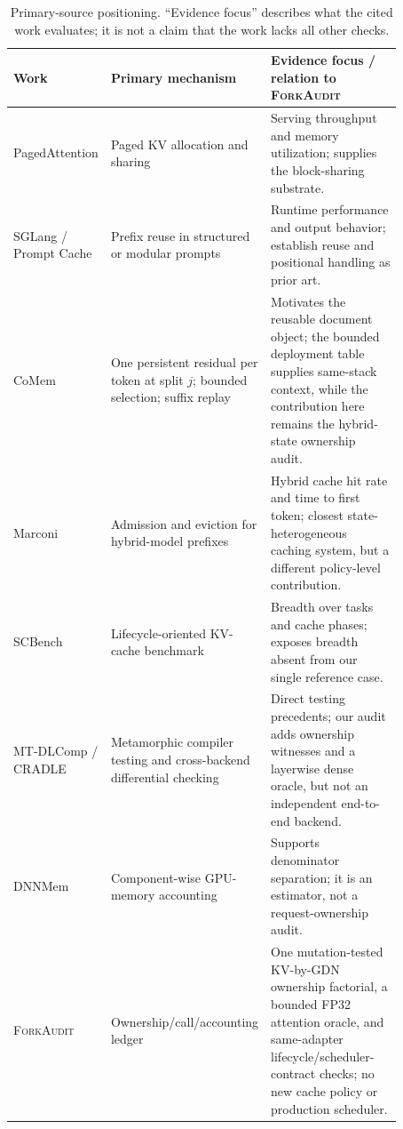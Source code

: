 \documentclass{article}
\newcommand{\method}{\textsc{ForkAudit}}
\begin{document}
\begin{table}[H]
  \caption{Primary-source positioning.  ``Evidence focus'' describes what the
  cited work evaluates; it is not a claim that the work lacks all other checks.}
  \label{tab:closest}
  \centering
  \footnotesize
  \begin{tabular}{@{}p{0.16\linewidth}p{0.28\linewidth}p{0.43\linewidth}@{}}
    \toprule
    Work & Primary mechanism & Evidence focus / relation to \method{} \\
    \midrule
    PagedAttention & Paged KV allocation and sharing~\citep{kwon2023pagedattention} & Serving throughput and memory utilization; supplies the block-sharing substrate. \\
    SGLang / Prompt Cache & Prefix reuse in structured or modular prompts~\citep{zheng2024sglang,gim2024promptcache} & Runtime performance and output behavior; establish reuse and positional handling as prior art. \\
    CoMem & One persistent residual per token at split $j$; bounded selection; suffix replay~\citep{liu2026comem,liu2026understanding} & Motivates the reusable document object; the bounded deployment table supplies same-stack context, while the contribution here remains the hybrid-state ownership audit. \\
    Marconi & Admission and eviction for hybrid-model prefixes~\citep{pan2025marconi} & Hybrid cache hit rate and time to first token; closest state-heterogeneous caching system, but a different policy-level contribution. \\
    SCBench & Lifecycle-oriented KV-cache benchmark~\citep{li2025scbench} & Breadth over tasks and cache phases; exposes breadth absent from our single reference case. \\
    MT-DLComp / CRADLE & Metamorphic compiler testing and cross-backend differential checking~\citep{xiao2022metamorphic,pham2019cradle} & Direct testing precedents; our audit adds ownership witnesses and a layerwise dense oracle, but not an independent end-to-end backend. \\
    DNNMem & Component-wise GPU-memory accounting~\citep{gao2020dnnmem} & Supports denominator separation; it is an estimator, not a request-ownership audit. \\
    \method{} & Ownership/call/accounting ledger & One mutation-tested KV-by-GDN ownership factorial, a bounded FP32 attention oracle, and same-adapter lifecycle/scheduler-contract checks; no new cache policy or production scheduler. \\
    \bottomrule
  \end{tabular}
\end{table}
\end{document}
